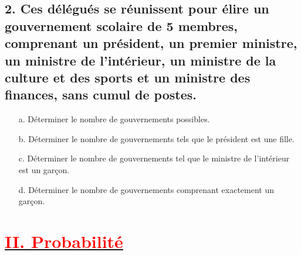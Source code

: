 \documentclass[12pt]{article}
\begin{document}
\subsection*{2. Ces délégués se réunissent pour élire un gouvernement scolaire de 5 membres, comprenant un président, un premier ministre, un ministre de l’intérieur, un ministre de la culture et des sports et un ministre des finances, sans cumul de postes.}
\begin{enumerate}
    \item[a.] Déterminer le nombre de gouvernements possibles. \\
    
    \item[b.] Déterminer le nombre de gouvernements tels que le président est une fille. \\
    
    \item[c.] Déterminer le nombre de gouvernements tel que le ministre de l’intérieur est un garçon. \\
    
    \item[d.] Déterminer le nombre de gouvernements comprenant exactement un garçon. \\
\end{enumerate}
\section*{\underline{\textbf{\textcolor{red}{II. Probabilité}}}}
\end{document}
